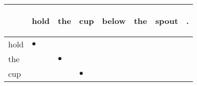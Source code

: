 \documentclass[landscape]{article}
\newcommand{\ssp}{\hspace{2pt}}
\newcommand{\mex}{\cellcolor{g}$\bullet$}
\begin{document}
\noindent\begin{tabular}{|l|p{10pt}|p{10pt}|p{10pt}|p{10pt}|p{10pt}|p{10pt}|p{10pt}|}
\hline
&\begin{sideways}\cellcolor{ref0}hold\hspace{12pt}\end{sideways}&\begin{sideways}\cellcolor{ref1}the\hspace{12pt}\end{sideways}&\begin{sideways}\cellcolor{ref2}cup\hspace{12pt}\end{sideways}&\begin{sideways}\cellcolor{ref3}below\hspace{12pt}\end{sideways}&\begin{sideways}\cellcolor{ref4}the\hspace{12pt}\end{sideways}&\begin{sideways}\cellcolor{ref5}spout\hspace{12pt}\end{sideways}&\begin{sideways}\cellcolor{ref6}.\hspace{12pt}\end{sideways}\\
\hline
\ssp \cellcolor{ref0}hold \ssp&\hspace{2pt}\mex&\hspace{2pt}&\hspace{2pt}&\hspace{2pt}&\hspace{2pt}&\hspace{2pt}&\hspace{2pt}\\
\hline
\ssp \cellcolor{ref1}the \ssp&\hspace{2pt}&\hspace{2pt}\mex&\hspace{2pt}&\hspace{2pt}&\hspace{2pt}&\hspace{2pt}&\hspace{2pt}\\
\hline
\ssp \cellcolor{ref2}cup \ssp&\hspace{2pt}&\hspace{2pt}&\hspace{2pt}\mex&\hspace{2pt}&\hspace{2pt}&\hspace{2pt}&\hspace{2pt}\\

\end{tabular}
\end{document}
